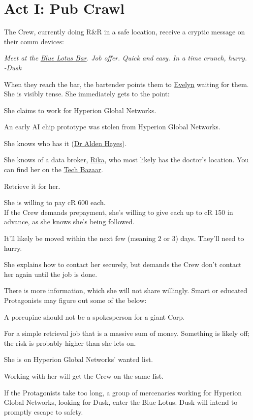 \chapter{Act I: Pub Crawl}
\label{ch:act1}
\vspace{-20mm} %
The Crew, currently doing R\&R in a safe location,
receive a cryptic message on their comm devices:
\begin{exampleblock}
	\itshape
	Meet at the \hyperref[location:bar]{Blue Lotus Bar}.
	Job offer. Quick and easy.
	In a time crunch, hurry.
	\\%
	-Dusk
\end{exampleblock}
When they reach the bar, the bartender points them to \hyperref[char:dusk]{Evelyn} waiting for them.
She is visibly tense.
She immediately gets to the point:
\begin{sitemize}
	\item She claims to work for Hyperion Global Networks.
	\item An early AI chip prototype was stolen from Hyperion Global Networks.
	\item She knows who has it (\hyperref[char:hayes]{Dr Alden Hayes}).
	\item She knows of a data broker, \hyperref[char:rika]{Rika},
		who most likely has the doctor's location.
		You can find her on the \hyperref[location:techbazaar]{Tech Bazaar}.
	\item Retrieve it for her.
	\item She is willing to pay cR 600 each.
		\\%
		If the Crew demands prepayment,
		she's willing to give each up to cR 150 in advance,
		as she knows she's being followed.
	\item It'll likely be moved within the next few (meaning 2 or 3) days.
		They'll need to hurry.
	\item She explains how to contact her securely,
		but demands the Crew don't contact her again until the job is done.
\end{sitemize}
\vspace{-5mm}
There is more information,
	which she will not share willingly.
Smart or educated Protagonists may figure out some of the below:
\begin{sitemize}
	\item A porcupine should not be a spokesperson for a giant Corp.
	\item For a simple retrieval job that is a massive sum of money.
		Something is likely off; the risk is probably higher than she lets on.
	\item She is on Hyperion Global Networks' wanted list.
	\item Working with her will get the Crew on the same list.
\end{sitemize}

\vspace{-5mm}
If the Protagonists take too long,
	a group of mercenaries working for Hyperion Global Networks,
	looking for Dusk,
	enter the Blue Lotus.
Dusk will intend to promptly escape to safety.

